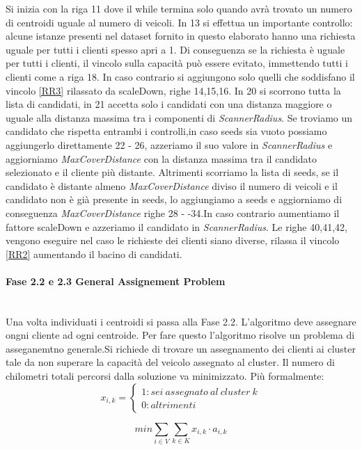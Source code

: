 \documentclass[]{article}
\begin{document}
Si inizia con la riga 11 dove il while termina solo quando avrà trovato un numero di centroidi uguale al numero di veicoli. In 13 si effettua un importante controllo: alcune istanze presenti nel dataset fornito in questo elaborato hanno una richiesta uguale per tutti i clienti spesso apri a 1. Di conseguenza se la richiesta è uguale per tutti i clienti, il vincolo sulla capacità può essere evitato, immettendo tutti i clienti come a riga 18. In caso contrario si aggiungono solo quelli che soddisfano il vincolo \ref{RR3} rilassato da scaleDown, righe 14,15,16. In 20 si scorrono tutta la lista di candidati, in 21 accetta solo i candidati con una distanza maggiore o uguale alla distanza massima tra i componenti di \textit{ScannerRadius}. Se troviamo un candidato che rispetta entrambi i controlli,in caso seeds sia vuoto possiamo aggiungerlo direttamente 22 - 26, azzeriamo il suo valore in \textit{ScannerRadius} e aggiorniamo \textit{MaxCoverDistance} con la distanza massima tra il candidato selezionato e il cliente più distante. Altrimenti scorriamo la lista di seeds, se il candidato è distante almeno \textit{MaxCoverDistance} diviso il numero di veicoli e il candidato non è già presente in seeds, lo aggiungiamo a seeds e aggiorniamo di conseguenza \textit{MaxCoverDistance}  righe 28 - -34.In caso contrario aumentiamo il fattore scaleDown e azzeriamo il candidato in \textit{ScannerRadius}. Le righe 40,41,42, vengono eseguire nel caso le richieste dei clienti siano diverse, rilassa il vincolo \ref{RR2} aumentando il bacino di candidati. 


\paragraph{Fase 2.2 e 2.3  General Assignement Problem} \hfill \\
Una volta individuati i centroidi si passa alla Fase 2.2. L'algoritmo deve assegnare ongni cliente ad ogni centroide. Per fare questo l'algoritmo risolve un problema di asseganemtno generale.Si richiede di trovare un assegnamento dei clienti ai cluster tale da non superare la capacità del veicolo assegnato al cluster. Il numero di chilometri totali percorsi dalla soluzione va minimizzato. Più formalmente:
\[x_{i,k} = \left\{
\begin{array}{lr}
1 :se i \ assegnato \ al \ cluster \ k \\
0 :altrimenti
\end{array}
\right.
\]

\begin{equation} \label{GAP1}
min \sum_{i \in V} \sum_{k \in K} x_{i,k} \cdot a_{i,k} 
\end{equation}
\end{document}
